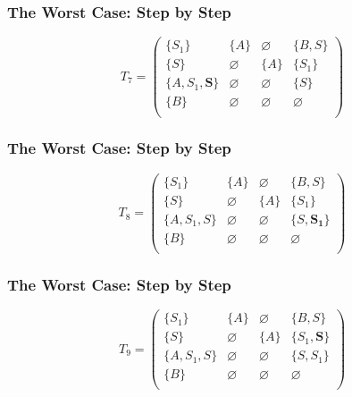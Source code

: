 \documentclass[xcolor=table]{beamer}
\begin{document}
\begin{frame}[noframenumbering]
  \transwipe[direction=90]
  \frametitle{The Worst Case: Step by Step}
\begin{figure}[h]
\[
T_7 = \begin{pmatrix}
\{S_1\}     & \{A\}       & \varnothing & \{B, S\}    \\
\{S\}       & \varnothing & \{A\}       & \{S_1\}     \\
\{A, S_1, \pmb{S}\}  & \varnothing & \varnothing & \{S\}    \\
\{B\}       & \varnothing & \varnothing & \varnothing \\
\end{pmatrix}
\]
\label{ExampleQueryFirstIteration}
\end{figure}
\end{frame} 

\begin{frame}[noframenumbering]
  \transwipe[direction=90]
  \frametitle{The Worst Case: Step by Step}
\begin{figure}[h]
\[
T_8 = \begin{pmatrix}
\{S_1\}     & \{A\}       & \varnothing & \{B, S\}    \\
\{S\}       & \varnothing & \{A\}       & \{S_1\}     \\
\{A, S_1, S\}  & \varnothing & \varnothing & \{S, \pmb{S_1}\} \\
\{B\}       & \varnothing & \varnothing & \varnothing \\
\end{pmatrix}
\]
\label{ExampleQueryFirstIteration}
\end{figure}
\end{frame} 

\begin{frame}[noframenumbering]
  \transwipe[direction=90]
  \frametitle{The Worst Case: Step by Step}
\begin{figure}[h]
\[
T_9 = \begin{pmatrix}
\{S_1\}     & \{A\}       & \varnothing & \{B, S\}    \\
\{S\}       & \varnothing & \{A\}       & \{S_1, \pmb{S}\}     \\
\{A, S_1, S\}  & \varnothing & \varnothing & \{S, S_1\} \\
\{B\}       & \varnothing & \varnothing & \varnothing \\
\end{pmatrix}
\]
\label{ExampleQueryFirstIteration}
\end{figure}
\end{frame} 
\end{document}
